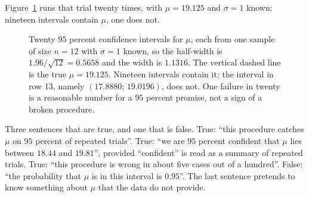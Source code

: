 Figure~\ref{fig:dua-puluh-selang} runs that trial twenty times, with
$\mu=19.125$ and $\sigma=1$ known: nineteen intervals contain $\mu$, one
does not.

\begin{figure}[htbp]
\centering
{}
\caption{Twenty $95$ percent confidence intervals for $\mu$, each from one
sample of size $n=12$ with $\sigma=1$ known, so the half-width is
$1.96/\sqrt{12}=0.5658$ and the width is $1.1316$. The vertical dashed line is the
true $\mu=19.125$. Nineteen intervals contain it; the interval in row
13, namely $(17.8880;\,19.0196)$, does not. One failure in twenty is a
reasonable number for a $95$ percent promise, not a sign of a broken procedure.}
\label{fig:dua-puluh-selang}
\end{figure}

\begin{catatan}
Three sentences that are true, and one that is false. True: ``this procedure catches $\mu$
on $95$ percent of repeated trials''. True: ``we are $95$ percent confident that $\mu$
lies between $18.44$ and $19.81$'', provided ``confident'' is read as a summary of
repeated trials. True: ``this procedure is wrong in about five cases out of a hundred''.
False: ``the probability that $\mu$ is in this interval is $0.95$''. The last sentence
pretends to know something about $\mu$ that the data do not provide.
\end{catatan}

